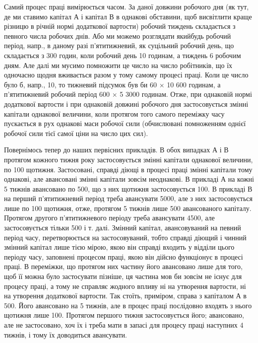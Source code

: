 Самий процес праці вимірюється часом. За даної довжини робочого
дня (як тут, де ми ставимо капітал $А$ і капітал $В$ в однакові обставини,
щоб висвітлити краще різницю в річній нормі додаткової вартости)
робочий тиждень складається з певного числа робочих днів. Або ми
можемо розглядати якийбудь робочий період, напр., в даному разі п’ятитижневий,
як суцільний робочий день, що складається з 300 годин, коли
робочий день \deq{} 10 годинам, а тиждень \deq{} 6 робочим дням. Але далі ми
мусимо помножити це число на число робітників, що їх одночасно щодня
вживається разом у тому самому процесі праці. Коли це число
було б, напр., 10, то тижневий підсумок був би \deq{} 60 × 10 \deq{} 600 годинам,
а п’ятитижневий робочий період \deq{} 600 × 5 \deq{} 3000 годинам. Отже,
при однаковій нормі додаткової вартости і при однаковій довжині робочого
дня застосовується змінні капітали однакової величини, коли протягом
того самого переміжку часу пускається в рух однакові маси робочої
сили (обчислювані помноженням однієї робочої сили тієї самої
ціни на число цих сил).

Повернімось тепер до наших первісних прикладів. В обох випадках
$А$ і $В$ протягом кожного тижня року застосовується змінні капітали
однакової величини, по 100 щотижня. Застосовані, справді діющі
в процесі праці змінні капітали тому однакові, але авансовані змінні
капітали зовсім неоднакові. В прикладі $А$ на кожні 5 тижнів авансовано по
500, що з них щотижня застосовується 100. В прикладі
$В$ на перший п’ятитижневий період треба авансувати 5000, але
з них застосовується лише по 100 щотижня, отже, протягом
5 тижнів лише 500 \deq{}  авансованого капіталу. Протягом
другого п’ятитижневого періоду треба авансувати 4500, але застосовується
тільки 500 і т. далі. Змінний капітал, авансовуваний
на певний період часу, перетворюється на застосовуваний, тобто справді
діющий і чинний змінний капітал лише тією мірою, якою він справді входить
у відділи цього періоду часу, заповнені процесом праці, якою він
дійсно функціонує в процесі праці. В переміжки, що протягом них
частину його авансовано лише для того, щоб її можна було застосувати
пізніше, ця частина мов би зовсім не існує для процесу праці, а тому
не справляє жодного впливу ні на утворення вартости, ні на утворення
додаткової вартости. Так стоїть, приміром, справа з капіталом $А$ в
500. Його авансовано на 5 тижнів, але в процес праці послідовно
входять з нього щотижня лише 100. Протягом першого тижня
застосовується  його;  авансовано, але не застосовано, хоч їх і
треба мати в запасі для процесу праці наступних 4 тижнів, і тому їх
доводиться авансувати.

